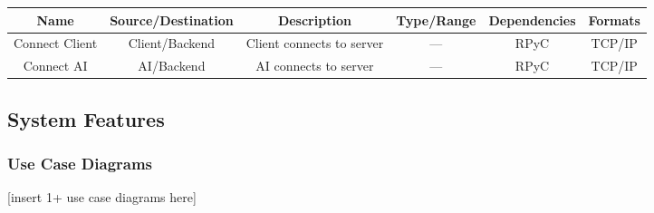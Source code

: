 \documentclass[twoside,letterpaper]{article}
\begin{document}
\bigskip

\begin{minipage}{\linewidth}
\centering
{}
\begin{tabular}{c c c c c c } \toprule[1.5pt]
\bf Name & \bf Source/Destination & \bf Description & \bf Type/Range & \bf Dependencies & \bf Formats\\ \toprule[1.0pt]
Connect Client & Client/Backend & Client connects to server & --- & RPyC & TCP/IP\\
Connect AI & AI/Backend & AI connects to server & --- & RPyC & TCP/IP\\
\bottomrule[1.5pt]
\end {tabular}\par
\end{minipage}

\clearpage %
\subsection{System Features}

\subsubsection{Use Case Diagrams}
[insert 1+ use case diagrams here]
\end{document}
